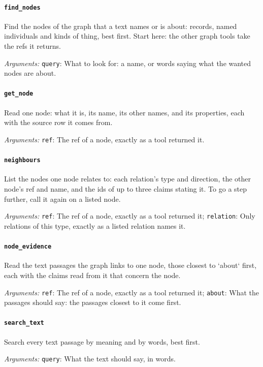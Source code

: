\paragraph{\texttt{find\_nodes}} Find the nodes of the graph that a text names or is about: records, named individuals and kinds of thing, best first. Start here: the other graph tools take the refs it returns.

\noindent\emph{Arguments:} \texttt{query}: What to look for: a name, or words saying what the wanted nodes are about.

\paragraph{\texttt{get\_node}} Read one node: what it is, its name, its other names, and its properties, each with the source row it comes from.

\noindent\emph{Arguments:} \texttt{ref}: The ref of a node, exactly as a tool returned it.

\paragraph{\texttt{neighbours}} List the nodes one node relates to: each relation's type and direction, the other node's ref and name, and the ids of up to three claims stating it. To go a step further, call it again on a listed node.

\noindent\emph{Arguments:} \texttt{ref}: The ref of a node, exactly as a tool returned it; \texttt{relation}: Only relations of this type, exactly as a listed relation names it.

\paragraph{\texttt{node\_evidence}} Read the text passages the graph links to one node, those closest to `about` first, each with the claims read from it that concern the node.

\noindent\emph{Arguments:} \texttt{ref}: The ref of a node, exactly as a tool returned it; \texttt{about}: What the passages should say: the passages closest to it come first.

\paragraph{\texttt{search\_text}} Search every text passage by meaning and by words, best first.

\noindent\emph{Arguments:} \texttt{query}: What the text should say, in words.

